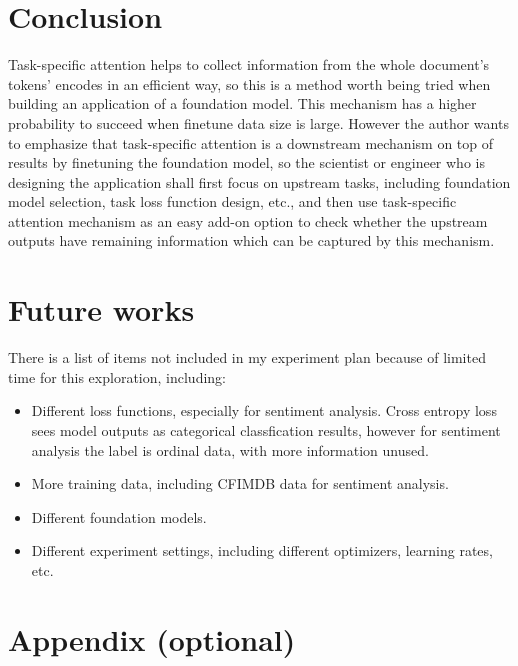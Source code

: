 \documentclass{article}
\begin{document}
\section{Conclusion}
\label{conclusion}
Task-specific attention helps to collect information from the whole document's tokens' encodes in an efficient way, so this is a method worth being tried when building an application of a foundation model. This mechanism has a higher probability to succeed when finetune data size is large. However the author wants to emphasize that task-specific attention is a downstream mechanism on top of results by finetuning the foundation model, so the scientist or engineer who is designing the application shall first focus on upstream tasks, including foundation model selection, task loss function design, etc., and then use task-specific attention mechanism as an easy add-on option to check whether the upstream outputs have remaining information which can be captured by this mechanism.

\section{Future works}
\label{future_works}
There is a list of items not included in my experiment plan because of limited time for this exploration, including:
\begin{itemize}
    \item Different loss functions, especially for sentiment analysis. Cross entropy loss sees model outputs as categorical classfication results, however for sentiment analysis the label is ordinal data, with more information unused.
    \item More training data, including CFIMDB data for sentiment analysis.
    \item Different foundation models.
    \item Different experiment settings, including different optimizers, learning rates, etc.
\end{itemize}







\newpage
\appendix

\section{Appendix (optional)}
\end{document}
